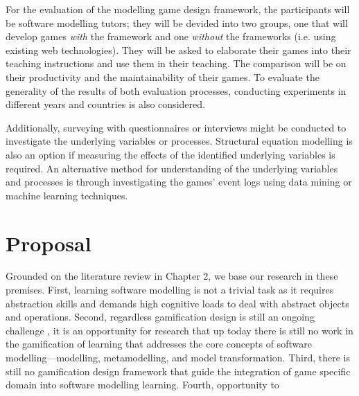 \documentclass[12pt, a4paper]{report}
\begin{document}
For the evaluation of the modelling game design framework, the participants will be software modelling tutors; they will be devided into two groups, one that will develop games \emph{with} the framework and one \emph{without} the frameworks (i.e. using existing web technologies). They will be asked to elaborate their games into their teaching instructions and use them in their teaching. The comparison will be on their productivity and the maintainability of their games. To evaluate the generality of the results of both evaluation processes, conducting experiments in different years and countries is also considered.

Additionally, surveying with questionnaires or interviews might be conducted to investigate the underlying variables or processes. Structural equation modelling \cite{hair2016primer} is also an option if measuring the effects of the identified underlying variables is required. An alternative method for understanding of the underlying variables and processes is through investigating the games' event logs using data mining or machine learning techniques.


\chapter{Proposal}
Grounded on the literature review in Chapter 2, we base our research in these premises. First, learning software modelling is not a trivial task as it requires abstraction skills and demands high cognitive loads to deal with abstract objects and operations. Second, regardless gamification design is still an ongoing challenge \cite{Deterding2013}, it is an opportunity for research that up today there is still no work in the gamification of learning that addresses the core concepts of software modelling—modelling, metamodelling, and model transformation. Third, there is still no gamification design framework that guide the integration of game specific domain into software modelling learning. Fourth, opportunity to 
\end{document}
